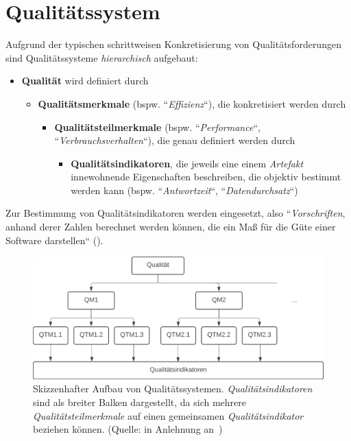 \section{Qualitätssystem}

\begin{tcolorbox}[title=Qualitätssystem]
    Aufgrund der typischen schrittweisen Konkretisierung von Qualitätsforderungen sind Qualitätssysteme  \textit{hierarchisch} aufgebaut:

    \begin{itemize}
        \item \textbf{Qualität} wird definiert durch
        \begin{itemize}
            \item  \textbf{Qualitätsmerkmale} (bspw. ``\textit{Effizienz}``), die konkretisiert werden durch
            \begin{itemize}
                \item  \textbf{Qualitätsteilmerkmale} (bspw. ``\textit{Performance}``, ``\textit{Verbrauchsverhalten}``), die genau definiert werden durch
                \begin{itemize}
                    \item \textbf{Qualitätsindikatoren}, die jeweils eine einem \textit{Artefakt} innewohnende Eigenschaften beschreiben, die objektiv bestimmt werden kann (bspw. ``\textit{Antwortzeit}``, ``\textit{Datendurchsatz}``)
                \end{itemize}
            \end{itemize}
        \end{itemize}
    \end{itemize}

    \noindent
    Zur Bestimmung von Qualitätsindikatoren werden  eingesetzt, also ``\textit{Vorschriften}, anhand derer Zahlen berechnet werden können, die ein Maß für die Güte einer Software darstellen`` (\cite[3, Hervorhebung eigene]{Wed09c}).
\end{tcolorbox}


\begin{figure}
    \centering
    \includegraphics[scale=0.8]{part four/Qualität/img/qualitätssysteme}
    \caption{Skizzenhafter Aufbau von Qualitätssystemen. \textit{Qualitätsindikatoren} sind als breiter Balken dargestellt, da sich mehrere \textit{Qualitätsteilmerkmale} auf einen gemeinsamen \textit{Qualitätsindikator} beziehen können. (Quelle: in Anlehnung an~\cite[Abb. 1.1, 3]{Wed09c})}
    \label{fig:qualitätssysteme-cc}
\end{figure}